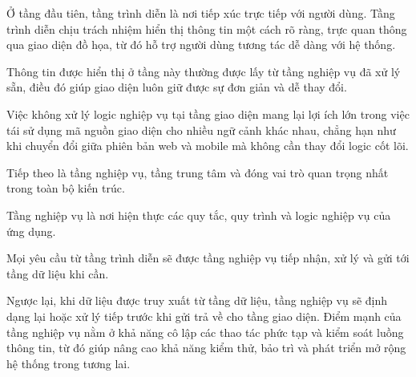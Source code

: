     \begin{flushleft}
      \hspace*{0.8cm}Ở tầng đầu tiên, tầng trình diễn là nơi tiếp xúc trực tiếp với người dùng.
      Tầng trình diễn chịu trách nhiệm hiển thị thông tin một cách rõ ràng, trực quan thông qua giao diện đồ họa, từ đó hỗ trợ người dùng tương tác dễ dàng với hệ thống.
    \end{flushleft}

    \begin{flushleft}
      \hspace*{0.8cm}Thông tin được hiển thị ở tầng này thường được lấy từ tầng nghiệp vụ đã xử lý sẵn, điều đó giúp giao diện luôn giữ được sự đơn giản và dễ thay đổi.
    \end{flushleft}

    \begin{flushleft}
      \hspace*{0.8cm}Việc không xử lý logic nghiệp vụ tại tầng giao diện mang lại lợi ích lớn trong việc tái sử dụng mã nguồn giao diện cho nhiều ngữ cảnh khác nhau, chẳng hạn như khi chuyển đổi giữa phiên bản web và mobile mà không cần thay đổi logic cốt lõi.
    \end{flushleft}

    \begin{flushleft}
      \hspace*{0.8cm}Tiếp theo là tầng nghiệp vụ, tầng trung tâm và đóng vai trò quan trọng nhất trong toàn bộ kiến trúc.
    \end{flushleft}

    \begin{flushleft}
      \hspace*{0.8cm}Tầng nghiệp vụ là nơi hiện thực các quy tắc, quy trình và logic nghiệp vụ của ứng dụng.
    \end{flushleft}

    \begin{flushleft}
      \hspace*{0.8cm}Mọi yêu cầu từ tầng trình diễn sẽ được tầng nghiệp vụ tiếp nhận, xử lý và gửi tới tầng dữ liệu khi cần.
    \end{flushleft}

    \begin{flushleft}
      \hspace*{0.8cm}Ngược lại, khi dữ liệu được truy xuất từ tầng dữ liệu, tầng nghiệp vụ sẽ định dạng lại hoặc xử lý tiếp trước khi gửi trả về cho tầng giao diện.
      Điểm mạnh của tầng nghiệp vụ nằm ở khả năng cô lập các thao tác phức tạp và kiểm soát luồng thông tin, từ đó giúp nâng cao khả năng kiểm thử, bảo trì và phát triển mở rộng hệ thống trong tương lai.
    \end{flushleft}

